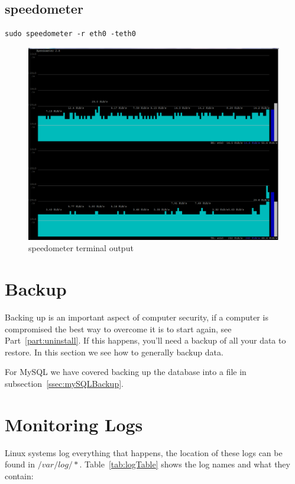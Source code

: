 \subsection{speedometer}

\begin{lstlisting}
sudo speedometer -r eth0 -teth0
\end{lstlisting}

\begin{figure}[!th]
\centering
\includegraphics[scale=0.35]{./supportfiles/speedometer.png}
\caption{speedometer terminal output}
\label{fig:speedometer}
\end{figure}


\section{Backup}

Backing up is an important aspect of computer security, if a computer is compromised the best way to overcome it is to start again, see Part~\ref{part:uninstall}.  If this happens, you'll need a backup of all your data to restore.  In this section we see how to generally backup data.

For MySQL we have covered backing up the database into a file in subsection~\ref{ssec:mySQLBackup}.


\section{Monitoring Logs}

Linux systems log everything that happens, the location of these logs can be found in $/var/log/*$.  Table~\ref{tab:logTable} shows the log names and what they contain:

